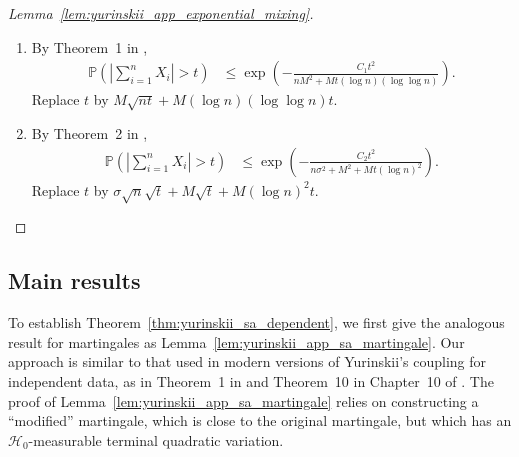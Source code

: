 \documentclass[11pt,lof]{puthesis}
\renewcommand{\P}{\ensuremath{\mathbb{P}}}
\newcommand{\cH}{\ensuremath{\mathcal{H}}}
\theoremstyle{break}
\theoremstyle{proof}
\newtheorem{proof}{Proof}
\begin{document}
\begin{proof}[Lemma~\ref{lem:yurinskii_app_exponential_mixing}]

  \begin{enumerate}[label=(\roman*)]

    \item
      By Theorem~1 in \citet{merlevede2009bernstein},
      \begin{align*}
        \P\left(
          \left|
          \sum_{i=1}^n
          X_i
          \right|
          > t
        \right)
        &\leq
        \exp\left(
          -\frac{C_1 t^2}{n M^2 + Mt (\log n)(\log\log n)}
        \right).
      \end{align*}
      Replace $t$ by
      $M \sqrt{n t} + M (\log n)(\log \log n) t$.

    \item
      By Theorem~2 in \citet{merlevede2009bernstein},
      \begin{align*}
        \P\left(
          \left|
          \sum_{i=1}^n
          X_i
          \right|
          > t
        \right)
        &\leq
        \exp\left(
          -\frac{C_2 t^2}{n\sigma^2 + M^2 + Mt (\log n)^2}
        \right).
      \end{align*}
      Replace $t$ by
      $\sigma \sqrt n \sqrt t + M \sqrt t + M (\log n)^2 t$.
  \end{enumerate}
\end{proof}

\subsection{Main results}

To establish Theorem~\ref{thm:yurinskii_sa_dependent}, we first
give the analogous result
for martingales as Lemma~\ref{lem:yurinskii_app_sa_martingale}. Our approach is
similar to
that used in modern versions of Yurinskii's coupling for independent data, as
in Theorem~1 in \citet{lecam1988} and Theorem~10 in Chapter~10 of
\citet{pollard2002user}. The proof of
Lemma~\ref{lem:yurinskii_app_sa_martingale} relies on
constructing a ``modified'' martingale, which is close to the original
martingale, but which has an $\cH_0$-measurable terminal quadratic variation.
\end{document}
